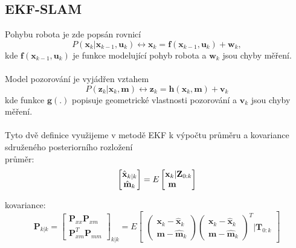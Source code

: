 \documentclass[12pt]{article}
\begin{document}
\subsection{EKF-SLAM}
Pohybu robota je zde popsán rovnicí
\begin{equation}
	P(\textbf{x}_k|\textbf{x}_{k-1},\textbf{u}_k)\leftrightarrow \textbf{x}_k=\textbf{f}(\textbf{x}_{k-1},\textbf{u}_k)+\textbf{w}_k,
\end{equation} 
kde $\textbf{f}(\textbf{x}_{k-1},\textbf{u}_k)$ je funkce modelující pohyb robota a $\textbf{w}_k$ jsou chyby měření.\\
\\
Model pozorování je vyjádřen vztahem
\begin{equation}
	P(\textbf{z}_k|\textbf{x}_k,\textbf{m})\leftrightarrow \textbf{z}_k=\textbf{h}(\textbf{x}_k,\textbf{m})+\textbf{v}_k
\end{equation}
kde funkce $\textbf{g}(.)$ popisuje geometrické vlastnosti pozorování a $\textbf{v}_k$ jsou chyby měření.\\
\\
Tyto dvě definice využijeme v metodě EKF k výpočtu průměru a kovariance sdruženého posteriorního rozložení\\
\indent průměr:
\begin{equation}
	\begin{bmatrix}
	\hat{\textbf{x}}_{k|k}\\\hat{\textbf{m}}_k
	\end{bmatrix}=E
	\begin{bmatrix}
	\textbf{x}_k |\textbf{Z}_{0:k}\\\textbf{m}\indent
	\end{bmatrix}
\end{equation}

\indent kovariance:
\begin{equation}
	\textbf{P}_{k|k}=\begin{bmatrix}
	\textbf{P}_{xx} \textbf{P}_{xm}\\\textbf{P}^T_{xm} \textbf{P}_{mm}
	\end{bmatrix}_{k|k}=E\begin{bmatrix}
	\begin{pmatrix}
	\textbf{x}_k-\hat{\textbf{x}}_k\\\textbf{m}-\hat{\textbf{m}}_k
	\end{pmatrix} \begin{pmatrix}
	\textbf{x}_k-\hat{\textbf{x}}_k\\\textbf{m}-\hat{\textbf{m}}_k
	\end{pmatrix}^T |\textbf{T}_{0:k}
	\end{bmatrix}
\end{equation}
\end{document}
